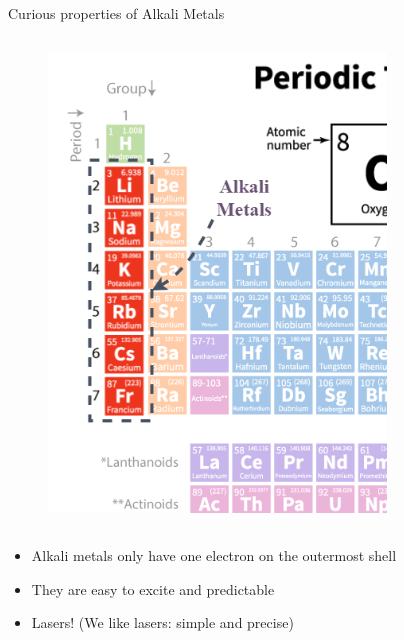 \begin{columnframe}{Curious properties of Alkali Metals}
    \begin{column}{0.5\textwidth}
        \begin{figure}
            \centering
            \includegraphics[width=0.8\textwidth]{images/alkali_metals_tb_of_elements.png}
        \end{figure}
    \end{column}
    \begin{column}{0.5\textwidth}
        \begin{itemize}
            \item Alkali metals only have one electron on the outermost shell
            \item They are easy to excite and predictable
            \item Lasers! (We like lasers: simple and precise)
        \end{itemize}
    \end{column}
\end{columnframe}

